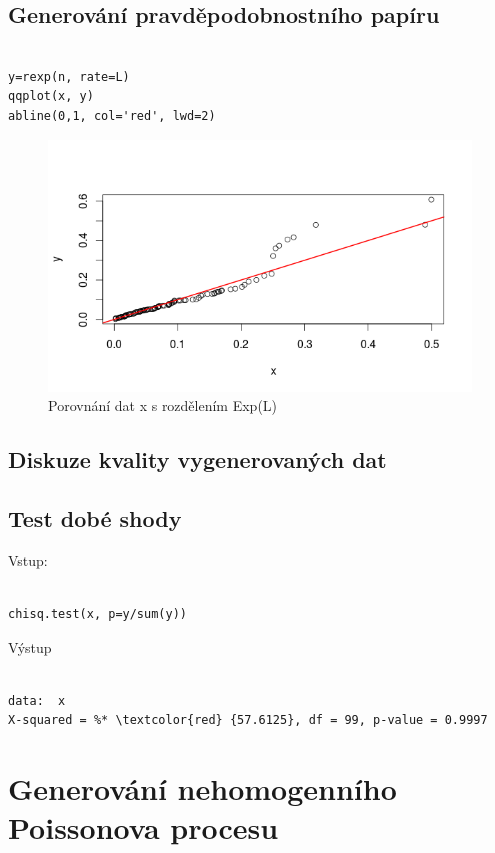 \documentclass[12pt]{article}
\begin{document}
\subsection{Generování pravděpodobnostního papíru}
  \begin{lstlisting}[frame=single]  % Start your code-block
  
y=rexp(n, rate=L)
qqplot(x, y)
abline(0,1, col='red', lwd=2)
\end{lstlisting}
\begin{figure}[ht!]
	\includegraphics[scale=0.5]{img/1_4_pravdepodobnostni_papir}\centering
	\caption{Porovnání dat x s rozdělením Exp(L)}
	\label{obr:sikme}
\end{figure}

\subsection{Diskuze kvality vygenerovaných dat}
\subsection{Test dobé shody}
Vstup:
 \begin{lstlisting}[frame=single]  % Start your code-block
  
chisq.test(x, p=y/sum(y)) 
\end{lstlisting}
Výstup
 \begin{lstlisting}[frame=single]  % Start your code-block
  
data:  x
X-squared = %* \textcolor{red} {57.6125}, df = 99, p-value = 0.9997
\end{lstlisting}

\section{Generování nehomogenního Poissonova procesu}
\end{document}
